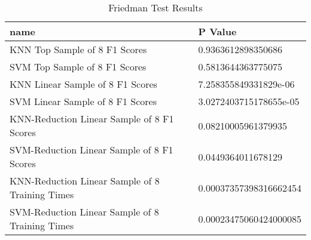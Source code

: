 \begin{table}
\centering
\caption{Friedman Test Results}
\label{tab:friedman_test_results_hepatitis}
\begin{tabular}{ll}
\toprule
name & P Value \\
\midrule
KNN Top Sample of 8 F1 Scores & 0.9363612898350686 \\
SVM Top Sample of 8 F1 Scores & 0.5813644363775075 \\
KNN Linear Sample of 8 F1 Scores & 7.258355849331829e-06 \\
SVM Linear Sample of 8 F1 Scores & 3.0272403715178655e-05 \\
KNN-Reduction Linear Sample of 8 F1 Scores & 0.08210005961379935 \\
SVM-Reduction Linear Sample of 8 F1 Scores & 0.0449364011678129 \\
KNN-Reduction Linear Sample of 8 Training Times & 0.00037357398316662454 \\
SVM-Reduction Linear Sample of 8 Training Times & 0.00023475060424000085 \\
\bottomrule
\end{tabular}
\end{table}
